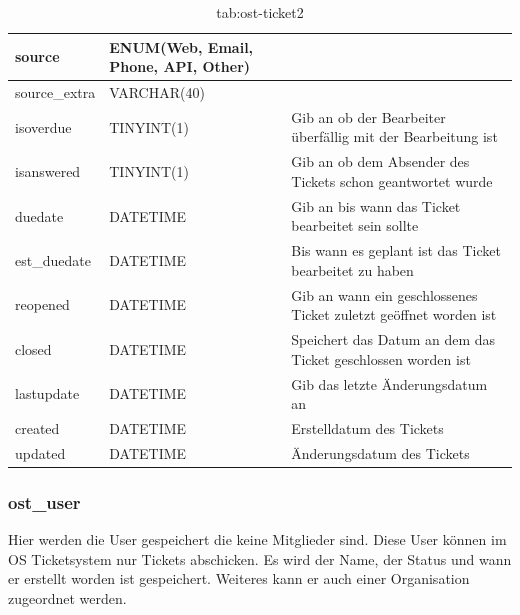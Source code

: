 		\newpage
		\begin{table}[h]
			\begin{tabular}{|p{3.5cm}|p{4cm}|p{6.2cm}|}
		\hline
		source & ENUM(Web, Email, Phone, API, Other) &\\
		\hline
		source\_extra & VARCHAR(40)&\\
		\hline
		isoverdue & TINYINT(1) & Gib an ob der Bearbeiter überfällig mit der Bearbeitung ist\\
		\hline
		isanswered & TINYINT(1) & Gib an ob dem Absender des Tickets schon geantwortet wurde\\
		\hline
		duedate & DATETIME & Gib an bis wann das Ticket bearbeitet sein sollte\\
		\hline
		est\_duedate & DATETIME & Bis wann es geplant ist das Ticket bearbeitet zu haben \\
		\hline
		reopened & DATETIME & Gib an wann ein geschlossenes Ticket zuletzt geöffnet worden ist \\
		\hline
		closed & DATETIME & Speichert das Datum an dem das Ticket geschlossen worden ist \\
		\hline
		lastupdate & DATETIME & Gib das letzte Änderungsdatum an \\
		\hline
		created & DATETIME & Erstelldatum des Tickets\\
		\hline
		updated & DATETIME & Änderungsdatum des Tickets\\
		\hline
	\end{tabular}
	\caption{tab:ost-ticket2}
\end{table}
\label{tab:ost_ticket2}

\newpage


\subsubsection{ost\_user}

Hier werden die User gespeichert die keine Mitglieder sind. Diese User können im OS Ticketsystem nur Tickets abschicken. Es wird der Name, der Status und wann er erstellt worden ist gespeichert. Weiteres kann er auch einer Organisation zugeordnet werden.

